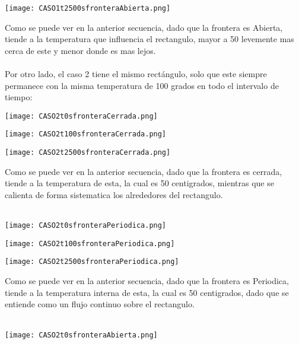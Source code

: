 \documentclass{article}
\begin{document}
\begin{center}
\texttt{[image: CASO1t2500sfronteraAbierta.png]}
\end{center}
Como se puede ver en la anterior secuencia, dado que la frontera es Abierta, tiende a la temperatura que influencia el rectangulo, mayor a 50 levemente mas cerca de este y menor donde es mas lejos.\\
\\
Por otro lado, el caso 2 tiene el mismo rectángulo, solo que este siempre permanece con la misma temperatura de 100 grados en todo el intervalo de tiempo:\\

\begin{center}
\texttt{[image: CASO2t0sfronteraCerrada.png]}
\end{center}

\begin{center}
\texttt{[image: CASO2t100sfronteraCerrada.png]}
\end{center}

\begin{center}
\texttt{[image: CASO2t2500sfronteraCerrada.png]}
\end{center}
Como se puede ver en la anterior secuencia, dado que la frontera es cerrada, tiende a la temperatura de esta, la cual es 50 centigrados, mientras que se calienta de forma sistematica los alrededores del rectangulo.\\
\\

\begin{center}
\texttt{[image: CASO2t0sfronteraPeriodica.png]}
\end{center}

\begin{center}
\texttt{[image: CASO2t100sfronteraPeriodica.png]}
\end{center}

\begin{center}
\texttt{[image: CASO2t2500sfronteraPeriodica.png]}
\end{center}
Como se puede ver en la anterior secuencia, dado que la frontera es Periodica, tiende a la temperatura interna de esta, la cual es 50 centigrados, dado que se entiende como un flujo continuo sobre el rectangulo. \\
\\

\begin{center}
\texttt{[image: CASO2t0sfronteraAbierta.png]}
\end{center}
\end{document}
